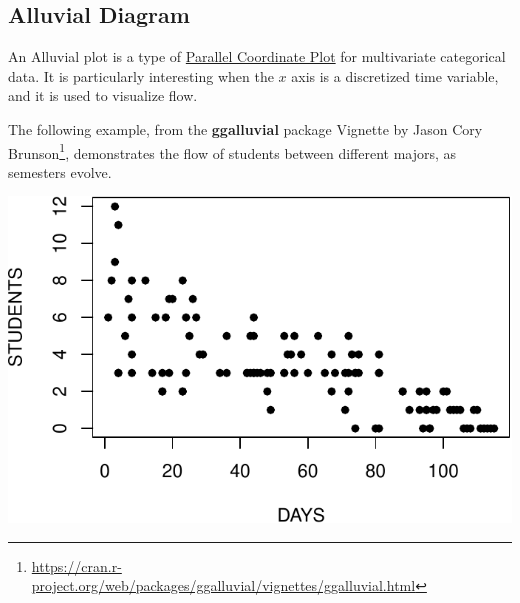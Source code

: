 \documentclass[]{book}
\newenvironment{Shaded}{\begin{snugshade}}{\end{snugshade}}
\newcommand{\DataTypeTok}[1]{\textcolor[rgb]{0.13,0.29,0.53}{#1}}
\newcommand{\KeywordTok}[1]{\textcolor[rgb]{0.13,0.29,0.53}{\textbf{#1}}}
\newcommand{\NormalTok}[1]{#1}
\newcommand{\OperatorTok}[1]{\textcolor[rgb]{0.81,0.36,0.00}{\textbf{#1}}}
\newcommand{\StringTok}[1]{\textcolor[rgb]{0.31,0.60,0.02}{#1}}
\renewcommand{\href}[2]{#2\footnote{\url{#1}}}
\theoremstyle{definition}
\theoremstyle{definition}
\theoremstyle{definition}
\theoremstyle{remark}
\begin{document}
\hypertarget{alluvial}{%
\subsection{Alluvial Diagram}\label{alluvial}}

An Alluvial plot is a type of \protect\hyperlink{parcoord}{Parallel Coordinate Plot} for multivariate categorical data.
It is particularly interesting when the \(x\) axis is a discretized time variable, and it is used to visualize flow.

The following example, from the \textbf{ggalluvial} package Vignette by \href{https://cran.r-project.org/web/packages/ggalluvial/vignettes/ggalluvial.html}{Jason Cory Brunson}, demonstrates the flow of students between different majors, as semesters evolve.

\begin{Shaded}
\end{Shaded}

\includegraphics[width=0.5\linewidth]{Rcourse_files/figure-latex/unnamed-chunk-144-1}
\end{document}
